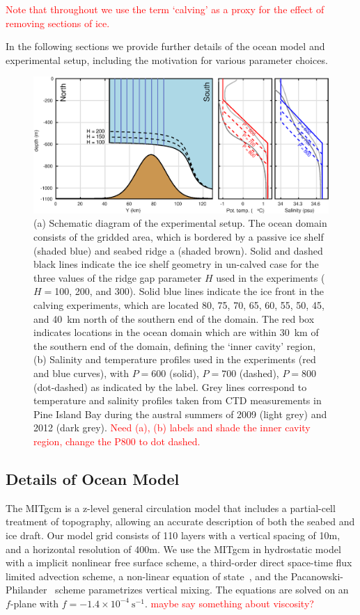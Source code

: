 \documentclass[draft]{agujournal2019}
\newcommand{\red}[1]{\textcolor{red}{#1}}
\begin{document}
\red{Note that throughout we use the term `calving' as a proxy for the effect of removing sections of ice.}


In the following sections we provide further details of the ocean model and experimental setup, including the motivation for various parameter choices.

\begin{figure}
    \centering
    \includegraphics[width = \textwidth]{../make_figures/plots/figure2.eps}
    \caption{(a) Schematic diagram of the experimental setup. The ocean domain consists of the gridded area, which is bordered by a passive ice shelf (shaded blue) and seabed ridge a (shaded brown). Solid and dashed black lines indicate the ice shelf geometry in un-calved case for the three values of the ridge gap parameter $H$ used in the experiments ($H = $100, 200, and 300). Solid blue lines indicate the ice front in the calving experiments, which are located 80, 75, 70, 65, 60, 55, 50, 45, and 40~km north of the southern end of the domain. The red box indicates locations in the ocean domain which are within 30~km of the southern end of the domain, defining the `inner cavity' region, (b) Salinity and temperature profiles used in the experiments (red and blue curves), with $P = 600$ (solid), $P = 700$ (dashed), $P = 800$ (dot-dashed) as indicated by the label. Grey lines correspond to temperature and salinity profiles taken from CTD measurements in Pine Island Bay during the austral summers of 2009 (light grey) and 2012 (dark grey).  \red{Need (a), (b) labels and shade the inner cavity region, change the P800 to dot dashed.} }
    \label{fig:Schematic}
\end{figure}

\subsection{Details of Ocean Model}
The MITgcm is a z-level general circulation model that includes a partial-cell treatment of topography, allowing an accurate description of both the seabed and ice draft. Our model grid consists of 110 layers with a vertical spacing of 10m, and a horizontal resolution of 400m. We use the MITgcm in hydrostatic model with a implicit nonlinear free surface scheme, a third-order direct space-time flux limited advection scheme, a non-linear equation of state~, and the Pacanowski-Philander~\cite{Pacanowski1981JPhysOcean} scheme parametrizes vertical mixing. The equations are solved on an $f$-plane with $f = -1.4\times10^{-4}~\text{s}^{-1}$. \red{maybe say something about viscosity?}
\end{document}
